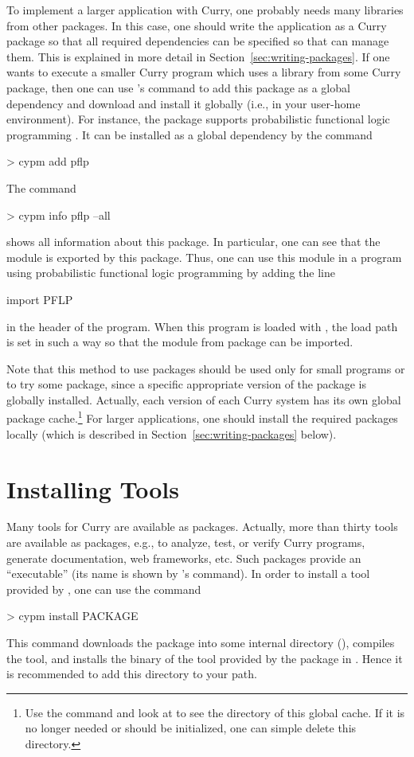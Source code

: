 To implement a larger application with Curry,
one probably needs many libraries
from other packages.
In this case, one should write the application as a Curry package
so that all required dependencies can be specified
so that \cpm can manage them.
This is explained in more detail in Section~\ref{sec:writing-packages}.
If one wants to execute a smaller Curry program
which uses a library from some Curry package,
then one can use \cpm's  command
to add this package as a global dependency and
download and install it globally (i.e., in your user-home environment).
For instance, the package  supports
probabilistic functional logic programming
\cite{ChristiansenDylusTeegen18}.
It can be installed as a global dependency by the command
%
\begin{curry}
> cypm add pflp
\end{curry}
%
The command
%
\begin{curry}
> cypm info pflp --all
\end{curry}
%
shows all information about this package.
In particular, one can see that the module 
is exported by this package.
Thus, one can use this module in a program
using probabilistic functional logic programming by adding the line
%
\begin{curry}
import PFLP
\end{curry}
%
in the header of the program.
When this program is loaded with \pakcs,
the load path is set in such a way so that
the module  from package 
can be imported.

Note that this method to use packages should be used only
for small programs or to try some package,
since a specific appropriate version of the package is globally installed.
Actually, each version of each Curry system
has its own global package cache.\footnote{%
Use the command  and look at 
to see the directory of this global cache.
If it is no longer needed or should be initialized,
one can simple delete this directory.}
For larger applications, one should install the required packages
locally (which is described in Section~\ref{sec:writing-packages} below).


\section{Installing Tools}
\label{sec:installing-tools}

Many tools for Curry are available as packages.
Actually, more than thirty tools are available as packages,
e.g., to analyze, test, or verify Curry programs,
generate documentation, web frameworks, etc.
Such packages provide an ``executable'' (its name is shown
by \cpm's  command).
In order to install a tool provided by ,
one can use the command
%
\begin{curry}
> cypm install PACKAGE
\end{curry}
%
This command downloads the package into some internal directory
(), compiles the tool,
and installs the binary of the tool provided by the package
in .
Hence it is recommended to add this directory to your path.

